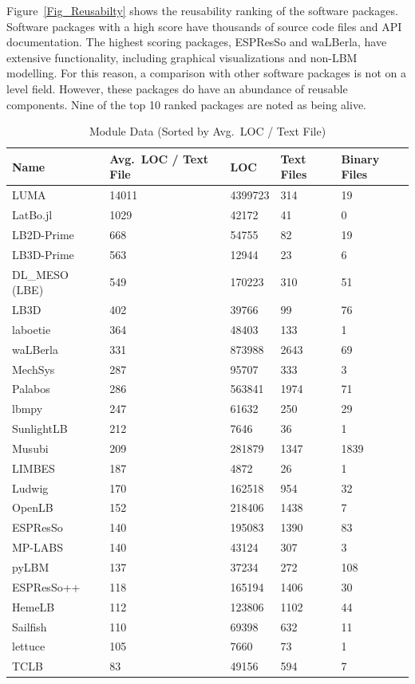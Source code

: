 \documentclass[final, 3p, times, authoryear]{elsarticle}
\begin{document}
Figure~\ref{Fig_Reusabilty} shows the reusability ranking of the software
packages. Software packages with a high score have thousands of source code
files and API documentation. The highest scoring packages, ESPResSo and
waLBerla, have extensive functionality, including graphical visualizations and
non-LBM modelling. For this reason, a comparison with other software packages is
not on a level field. However, these packages do have an abundance of reusable
components. Nine of the top 10 ranked packages are noted as being alive.

\begin{table}[ht!]
	\begin{center}
		\begin{tabular}{ p{3cm}p{3cm}p{2cm}p{2cm}p{2cm} }
			\toprule
			Name & Avg.\ LOC / Text File & LOC & Text Files & Binary Files \\
			\midrule
			LUMA & 14011 & 4399723 & 314 & 19 \\
			LatBo.jl & 1029 & 42172 & 41& 0 \\
			LB2D-Prime & 668 & 54755 & 82& 19 \\
			LB3D-Prime & 563 & 12944 & 23& 6 \\
			DL\_MESO (LBE) & 549 & 170223 & 310 & 51 \\
			LB3D & 402 & 39766 & 99 & 76 \\
			laboetie & 364 & 48403 & 133& 1 \\
			waLBerla & 331 & 873988 & 2643 & 69 \\
			MechSys & 287 & 95707 & 333 & 3 \\
			Palabos & 286 & 563841 & 1974 & 71 \\
			lbmpy & 247 & 61632 & 250 & 29 \\
			SunlightLB & 212 & 7646 & 36 & 1 \\
			Musubi & 209 & 281879 & 1347 & 1839 \\
			LIMBES & 187 & 4872 & 26 & 1 \\
			Ludwig & 170 & 162518 & 954 & 32 \\
			OpenLB & 152 & 218406 & 1438 & 7 \\
			ESPResSo & 140 & 195083 & 1390& 83 \\
			MP-LABS & 140 & 43124 & 307 & 3 \\
			pyLBM & 137 & 37234 & 272 & 108 \\
			ESPResSo++ & 118 & 165194 & 1406& 30 \\
			HemeLB & 112 & 123806 & 1102& 44 \\
			Sailfish & 110 & 69398 & 632 & 11 \\
			lettuce & 105 & 7660 & 73 & 1 \\
			TCLB & 83 & 49156 & 594 & 7 \\
			\bottomrule
		\end{tabular}
		\caption{Module Data (Sorted by Avg.\ LOC / Text File)} \label{moduledata}
	\end{center}
\end{table}
\end{document}
